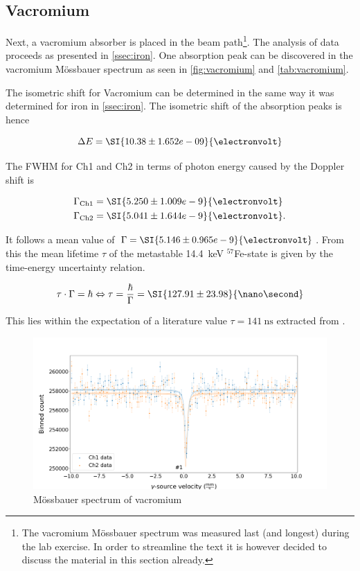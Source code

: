 
\subsection{Vacromium}
\label{ssec:vacromium}

Next, a vacromium absorber is placed in the beam path\footnote{The vacromium
Mössbauer spectrum was measured last (and longest) during the lab exercise. In order
to streamline the text it is however decided to discuss the material in this section
already.}. The analysis of data proceeds as presented in \autoref{ssec:iron}. One
absorption peak can be discovered in the vacromium Mössbauer spectrum as seen in
\autoref{fig:vacromium} and \autoref{tab:vacromium}.

The isometric shift for Vacromium can be determined in the same way it was determined
for iron in \autoref{ssec:iron}. The isometric shift of the absorption peaks is hence

\begin{equation}
\Delta E = \SI{10.38\pm1.652e-09}{\electronvolt}
\end{equation}


The FWHM for Ch1 and Ch2 in terms of photon energy caused by the Doppler shift is

\begin{align*}
\Gamma_\text{Ch1} &= \SI{5.250\pm1.009e-9}{\electronvolt} \\
\Gamma_\text{Ch2} &= \SI{5.041\pm1.644e-9}{\electronvolt}.
\end{align*}

It follows a mean value of $\Gamma = \SI{5.146\pm0.965e-9}{\electronvolt}$. From
this the mean lifetime $\tau$ of the metastable \SI{14.4}{\kilo\electronvolt}
$^{57}$Fe-state is given by the time-energy uncertainty relation.

\begin{equation}
\label{eq:tau-iron}
\tau\cdot\Gamma = \hbar \Leftrightarrow \tau = \frac{\hbar}{\Gamma} = \SI{127.91\pm23.98}{\nano\second}
\end{equation}

This lies within the expectation of a literature value $\tau=\SI{141}{\nano\second}$
extracted from \cite{nishida1981moessbauer}.

\begin{figure}
	\centering
	\includegraphics[width=1.0\textwidth]{./fig/Vacromium.png}
	\caption{Mössbauer spectrum of vacromium}
	\label{fig:vacromium}
\end{figure}


